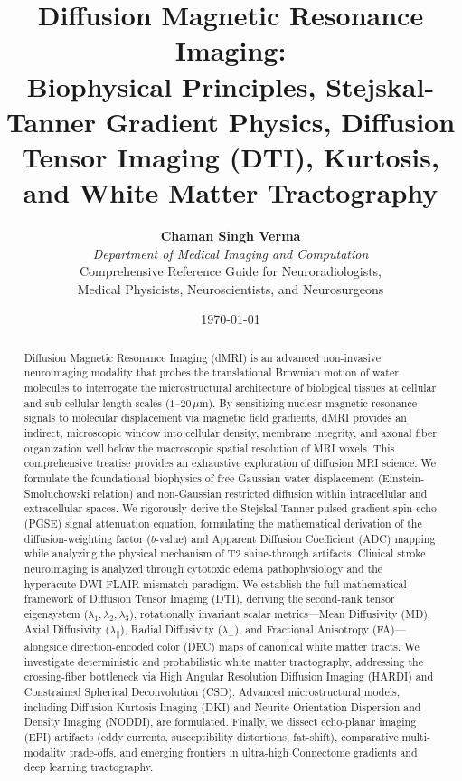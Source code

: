 \documentclass[11pt,a4paper]{article}
\title{\textbf{\huge Diffusion Magnetic Resonance Imaging:}\\[0.4em]
\Large Biophysical Principles, Stejskal-Tanner Gradient Physics, Diffusion Tensor Imaging (DTI), Kurtosis, and White Matter Tractography}
\author{\textbf{Chaman Singh Verma} \\
\textit{Department of Medical Imaging and Computation} \\
\small \textsf{Comprehensive Reference Guide for Neuroradiologists,}\\[0.2em]
\small \textsf{Medical Physicists, Neuroscientists, and Neurosurgeons}}
\date{\today}
\begin{document}
\maketitle

\begin{abstract}
Diffusion Magnetic Resonance Imaging (dMRI) is an advanced non-invasive neuroimaging modality that probes the translational Brownian motion of water molecules to interrogate the microstructural architecture of biological tissues at cellular and sub-cellular length scales ($1\text{--}20\,\mu\text{m}$). By sensitizing nuclear magnetic resonance signals to molecular displacement via magnetic field gradients, dMRI provides an indirect, microscopic window into cellular density, membrane integrity, and axonal fiber organization well below the macroscopic spatial resolution of MRI voxels. This comprehensive treatise provides an exhaustive exploration of diffusion MRI science. We formulate the foundational biophysics of free Gaussian water displacement (Einstein-Smoluchowski relation) and non-Gaussian restricted diffusion within intracellular and extracellular spaces. We rigorously derive the Stejskal-Tanner pulsed gradient spin-echo (PGSE) signal attenuation equation, formulating the mathematical derivation of the diffusion-weighting factor ($b$-value) and Apparent Diffusion Coefficient (ADC) mapping while analyzing the physical mechanism of T2 shine-through artifacts. Clinical stroke neuroimaging is analyzed through cytotoxic edema pathophysiology and the hyperacute DWI-FLAIR mismatch paradigm. We establish the full mathematical framework of Diffusion Tensor Imaging (DTI), deriving the second-rank tensor eigensystem ($\lambda_1, \lambda_2, \lambda_3$), rotationally invariant scalar metrics—Mean Diffusivity (MD), Axial Diffusivity ($\lambda_\parallel$), Radial Diffusivity ($\lambda_\perp$), and Fractional Anisotropy (FA)—alongside direction-encoded color (DEC) maps of canonical white matter tracts. We investigate deterministic and probabilistic white matter tractography, addressing the crossing-fiber bottleneck via High Angular Resolution Diffusion Imaging (HARDI) and Constrained Spherical Deconvolution (CSD). Advanced microstructural models, including Diffusion Kurtosis Imaging (DKI) and Neurite Orientation Dispersion and Density Imaging (NODDI), are formulated. Finally, we dissect echo-planar imaging (EPI) artifacts (eddy currents, susceptibility distortions, fat-shift), comparative multi-modality trade-offs, and emerging frontiers in ultra-high Connectome gradients and deep learning tractography.
\end{abstract}
\end{document}
